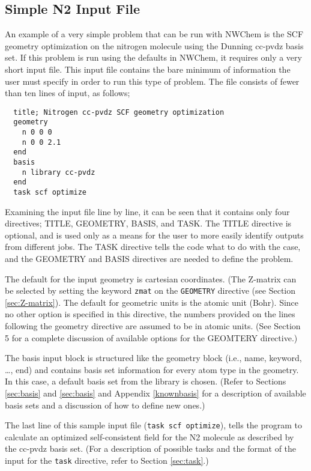 \subsection{Simple N2 Input File}
\label{sec:simplesample}

An example of a very simple problem that can be run with NWChem is the
SCF geometry optimization on the nitrogen molecule using the Dunning 
cc-pvdz basis set.  If this problem is run using the defaults in NWChem, 
it requires only a very short input file.  This input file contains
the bare minimum of information the user must specify in order to run 
this type of problem.  The file consists of fewer than ten lines of input,
as follows;

\begin{verbatim}
  title; Nitrogen cc-pvdz SCF geometry optimization
  geometry 
    n 0 0 0
    n 0 0 2.1
  end
  basis
    n library cc-pvdz
  end
  task scf optimize
\end{verbatim}

Examining the input file line by line, it can be seen that it contains 
only four directives; TITLE, GEOMETRY, BASIS, and TASK.  The TITLE directive
is optional, and is used only as a means for the user to more easily identify
outputs from different jobs.  The TASK directive tells the code what to
do with the case, and the GEOMETRY and BASIS directives are needed
to define the problem.

The default for the input geometry is cartesian coordinates.  (The Z-matrix
can be selected by setting the keyword \verb+zmat+ on the \verb+GEOMETRY+
directive (see Section \ref{sec:Z-matrix}).
The default for geometric units is the atomic unit (Bohr).  Since no other
option is specified in this directive, the numbers provided on the lines
following the geometry directive are assumed to be in atomic units.
(See Section 5 for a complete discussion of available options for the 
GEOMTERY directive.) 

The basis input block is structured like the geometry block (i.e., name, keyword,
\ldots, end) and contains basis set information for every atom type in
the geometry. In this case, a default basis set from the library is
chosen.  (Refer to Sections \ref{sec:basis} and \ref{sec:basis} and
Appendix \ref{knownbasis}
for a description of available basis sets and a discussion of how to define
new ones.)

The last line of this sample input file ({\tt task scf optimize}),
tells the program to calculate an optimized self-consistent field for the
N2 molecule as described by the cc-pvdz basis set.
(For a description of possible tasks and the format of the input
for the {\tt task} directive, refer to Section \ref{sec:task}.)

